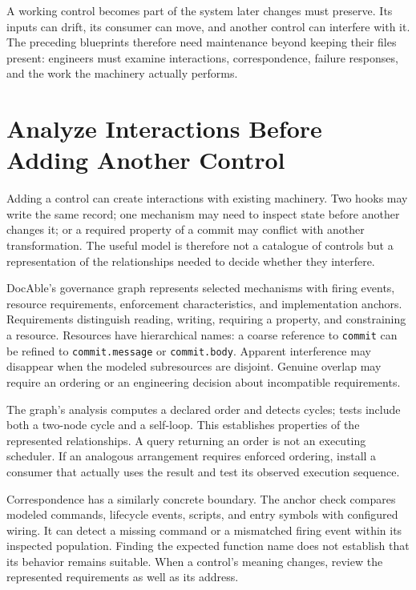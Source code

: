 
A working control becomes part of the system later changes must preserve. Its inputs can drift, its consumer can move, and another control can interfere with it. The preceding blueprints therefore need maintenance beyond keeping their files present: engineers must examine interactions, correspondence, failure responses, and the work the machinery actually performs.

\section{Analyze Interactions Before Adding Another Control}\label{heading:handbook-model-governance-graph}

Adding a control can create interactions with existing machinery. Two hooks may write the same record; one mechanism may need to inspect state before another changes it; or a required property of a commit may conflict with another transformation. The useful model is therefore not a catalogue of controls but a representation of the relationships needed to decide whether they interfere.

DocAble's governance graph represents selected mechanisms with firing events, resource requirements, enforcement characteristics, and implementation anchors. Requirements distinguish reading, writing, requiring a property, and constraining a resource. Resources have hierarchical names: a coarse reference to \texttt{commit} can be refined to \texttt{commit.message} or \texttt{commit.body}. Apparent interference may disappear when the modeled subresources are disjoint. Genuine overlap may require an ordering or an engineering decision about incompatible requirements.

The graph's analysis computes a declared order and detects cycles; tests include both a two-node cycle and a self-loop. This establishes properties of the represented relationships. A query returning an order is not an executing scheduler. If an analogous arrangement requires enforced ordering, install a consumer that actually uses the result and test its observed execution sequence.

Correspondence has a similarly concrete boundary. The anchor check compares modeled commands, lifecycle events, scripts, and entry symbols with configured wiring. It can detect a missing command or a mismatched firing event within its inspected population. Finding the expected function name does not establish that its behavior remains suitable. When a control's meaning changes, review the represented requirements as well as its address.

